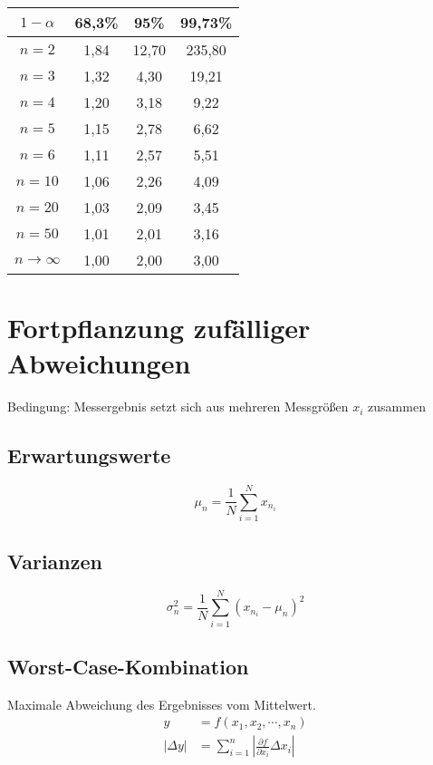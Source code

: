 \begin{center}
\begin{tabular}{c|c|c|c}
\(1 - \alpha\) & 68,3\% & 95\% & 99,73\%\\
\hline
\(n = 2\) & 1,84 & 12,70 & 235,80\\
\(n = 3\) & 1,32 & 4,30 & 19,21\\
\(n = 4\) & 1,20 & 3,18 & 9,22\\
\(n = 5\) & 1,15 & 2,78 & 6,62\\
\(n = 6\) & 1,11 & 2,57 & 5,51\\
\(n = 10\) & 1,06 & 2,26 & 4,09\\
\(n = 20\) & 1,03 & 2,09 & 3,45\\
\(n = 50\) & 1,01 & 2,01 & 3,16\\
\(n \rightarrow \infty\) & 1,00 & 2,00 & 3,00\\
\end{tabular}
\end{center}

\section{Fortpflanzung zufälliger Abweichungen}
Bedingung: Messergebnis setzt sich aus mehreren Messgrößen \(x_i\) zusammen

\begin{multicols}{2}
	\subsection*{Erwartungswerte}
	\[
	\mu_n = \frac{1}{N}\sum_{i = 1}^{N}x_{n_i}
	\]
	\subsection*{Varianzen}
	\[
	\sigma_{n}^{2} = \frac{1}{N}\sum_{i = 1}^{N} \left( x_{n_i} - \mu_n
	\right)^{2}
	\]
	\vfill
\end{multicols}

\subsection*{Worst-Case-Kombination}
Maximale Abweichung des Ergebnisses vom Mittelwert.
\begin{align*}
	y &= f\left( x_1, x_2, \cdots, x_n  \right)\\
	\left| \Delta y \right| &= \sum_{i = 1}^{n} \left| \frac{\partial f}{\partial
	x_i} \Delta x_i \right|
\end{align*}

